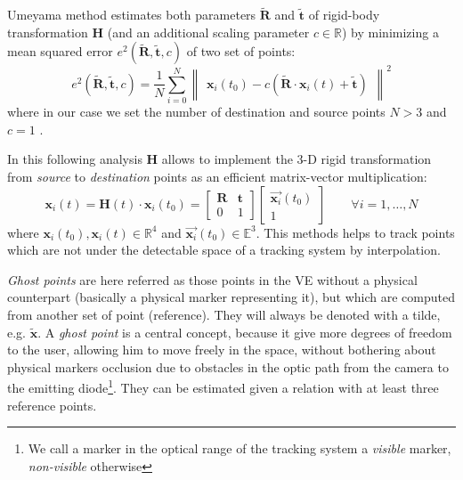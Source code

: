 \documentclass[acmtocl,acmnow]{acmtrans2m}
\begin{document}
Umeyama method estimates both parameters $\tilde{\mathbf{R}}$ and $\tilde{\mathbf{t}}$ of rigid-body transformation $\mathbf{H}$ (and an
additional scaling parameter $c\in \mathbb{R}$) by minimizing a mean squared error $e^2(\tilde{\mathbf{R}},\tilde{\mathbf{t}},c)$ of two set of points:
\begin{equation}\label{eq:umeyama}
e^2(\tilde{\mathbf{R}},\tilde{\mathbf{t}},c) = 
 \dfrac{1}{N}  \sum \limits_{i=0}^N \begin{Vmatrix} \mathbf{x}_{i}(t_0)
-c(\tilde{\mathbf{R}} \cdot \mathbf{x}_i(t) + \tilde{\mathbf{t}}) \end{Vmatrix}^2
\end{equation}
where in our case we set the number of destination and source points $N>3$ and $c=1$ \cite{umeyama,DBLP:books/daglib/0086372}. 

In this following analysis $\mathbf{H}$ allows to implement the 3-D rigid transformation from \emph{source} to \emph{destination} points as an efficient matrix-vector multiplication:
\begin{equation}
 \mathbf{x}_i(t) =  \mathbf{H}(t)\cdot \mathbf{x}_i(t_0) = \begin{bmatrix} \mathbf{R} & \mathbf{t} \\ 0 & 1\end{bmatrix} \begin{bmatrix} \vec{\mathbf{x}_i}(t_0) \\ 1\end{bmatrix}\qquad \forall
i=1,\ldots,N
\end{equation}
where $\mathbf{x}_i(t_0), \mathbf{x}_i(t) \in \mathbb{R}^4$ and $\vec{\mathbf{x}_i}(t_0)\in \mathbb{E}^3$. This methods helps to track points which are not under the detectable space of a tracking system by interpolation.

\emph{Ghost points} are here referred as those points in the VE without a
physical counterpart (basically a physical marker representing it), but which are computed from another set of point (reference). They will always be denoted
 with a tilde, e.g. $\tilde{\mathbf{x}}$. A \emph{ghost point} is a central concept, because it give more degrees of freedom to the user, allowing him to move freely in the space, without bothering
about physical markers occlusion due to obstacles in the optic path from the camera to the emitting diode\footnote{We call a marker in the optical range of the tracking system a \emph{visible} marker, \emph{non-visible} otherwise}.
They can be estimated given a relation with at least three reference points.
\end{document}
